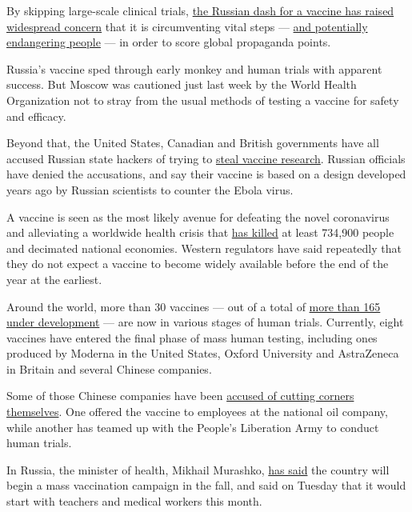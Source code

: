 By skipping large-scale clinical trials,
\href{https://www.nytimes3xbfgragh.onion/2020/08/11/health/russia-covid-19-vaccine-safety.html}{the
Russian dash for a vaccine has raised widespread concern} that it is
circumventing vital steps ---
\href{https://www.nytimes3xbfgragh.onion/2020/08/11/health/russia-covid-19-vaccine-safety.html}{and
potentially endangering people} --- in order to score global propaganda
points.

Russia's vaccine sped through early monkey and human trials with
apparent success. But Moscow was cautioned just last week by the World
Health Organization not to stray from the usual methods of testing a
vaccine for safety and efficacy.

Beyond that, the United States, Canadian and British governments have
all accused Russian state hackers of trying to
\href{https://www.nytimes3xbfgragh.onion/2020/07/16/us/politics/vaccine-hacking-russia.html}{steal
vaccine research}. Russian officials have denied the accusations, and
say their vaccine is based on a design developed years ago by Russian
scientists to counter the Ebola virus.

A vaccine is seen as the most likely avenue for defeating the novel
coronavirus and alleviating a worldwide health crisis that
\href{https://www.nytimes3xbfgragh.onion/interactive/2020/world/coronavirus-maps.html}{has
killed} at least 734,900 people and decimated national economies.
Western regulators have said repeatedly that they do not expect a
vaccine to become widely available before the end of the year at the
earliest.

Around the world, more than 30 vaccines --- out of a total of
\href{https://www.nytimes3xbfgragh.onion/interactive/2020/science/coronavirus-vaccine-tracker.html}{more
than 165 under development} --- are now in various stages of human
trials. Currently, eight vaccines have entered the final phase of mass
human testing, including ones produced by Moderna in the United States,
Oxford University and AstraZeneca in Britain and several Chinese
companies.

Some of those Chinese companies have been
\href{https://www.nytimes3xbfgragh.onion/2020/07/16/business/china-vaccine-coronavirus.html}{accused
of cutting corners themselves}. One offered the vaccine to employees at
the national oil company, while another has teamed up with the People's
Liberation Army to conduct human trials.

In Russia, the minister of health, Mikhail Murashko,
\href{https://ria.ru/20200801/1575248763.html}{has said} the country
will begin a mass vaccination campaign in the fall, and said on Tuesday
that it would start with teachers and medical workers this month.

